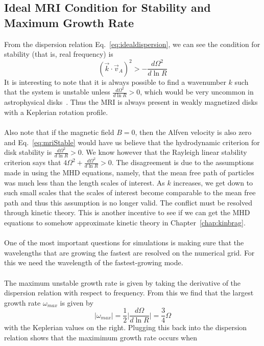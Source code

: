 \subsection{Ideal MRI Condition for Stability and Maximum Growth Rate}
From the dispersion relation Eq.~\ref{eq:idealdispersion}, we can see the condition for stability (that is, real frequency) is
\begin{equation}
  (\vec k\cdot\vec v_A)^2>-\frac{d\Omega^2}{d\ln R} \label{eq:mriStable}
\end{equation}
It is interesting to note that it is always possible to find a wavenumber $k$ such that the system is unstable unless $\frac{d\Omega^2}{d\ln R}>0$, which would be very uncommon in astrophysical disks~\cite{BH1998}. Thus the MRI is always present in weakly magnetized disks with a Keplerian rotation profile.\\
\\
Also note that if the magnetic field $B=0$, then the Alfven velocity is also zero and Eq.~\ref{eq:mriStable} would have us believe that the hydrodynamic criterion for disk stability is $\frac{d\Omega^2}{d\ln R}>0$. We know however that the Rayleigh linear stability criterion says that $4\Omega^2+\frac{d\Omega^2}{d\ln R}>0$. The disagreement is due to the assumptions made in using the MHD equations, namely, that the mean free path of particles was much less than the length scales of interest. As $k$ increases, we get down to such small scales that the scales of interest become comparable to the mean free path and thus this assumption is no longer valid. The conflict must be resolved through kinetic theory. This is another incentive to see if we can get the MHD equations to somehow approximate kinetic theory in Chapter~\ref{chap:kinbrag}.\\
\\
One of the most important questions for simulations is making sure that the wavelengths that are growing the fastest are resolved on the numerical grid. For this we need the wavelength of the fastest-growing mode. \\
\\
The maximum unstable growth rate is given by taking the derivative of the dispersion relation with respect to frequency. From this we find that the largest growth rate $\omega_{max}$ is given by
\begin{equation}
  |\omega_{max}|=\frac12\big|\frac{d\Omega}{d\ln R}\big|=\frac34\Omega
\end{equation}
with the Keplerian values on the right. Plugging this back into the dispersion relation shows that the maximimum growth rate occurs when
